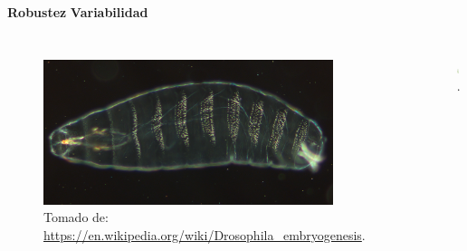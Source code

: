 \documentclass{beamer}
\begin{document}
\begin{frame}
\hspace{20 mm} \textbf{Robustez} \hspace{40 mm} \textbf{Variabilidad}
\begin{columns}[c]
\begin{figure}[p]
    \centering
    \includegraphics[width=0.9\textwidth]{drosophila.jpg}\\
    \tiny Tomado de: \url{https://en.wikipedia.org/wiki/Drosophila_embryogenesis}.
\end{figure}

\begin{figure}[p]
    \centering
    \includegraphics[width=0.7\textwidth]{lambda.jpg}\\
    \tiny \cite{p4}.
\end{figure}
\end{columns}
\end{frame}
\end{document}

